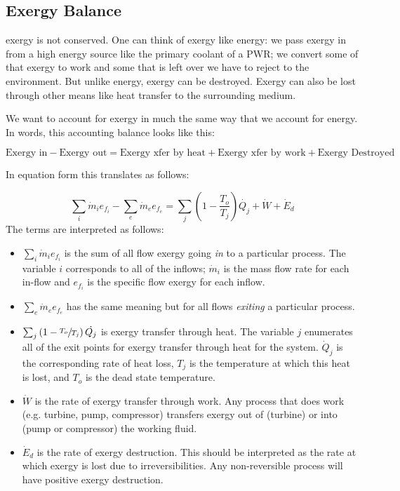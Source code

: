 \subsection{Exergy Balance}
 exergy is not conserved.  One can think of exergy like energy: we pass exergy in from a high energy source like the primary coolant of a PWR; we convert some of that exergy to work and some that is left over we have to reject to the environment.  But unlike energy, exergy can be destroyed. Exergy can also be lost through other means like heat transfer to the surrounding medium.

We want to account for exergy in much the same way that we account for energy.  In words, this accounting balance looks like this:

$$\text{Exergy in} - \text{Exergy out} = \text{Exergy xfer by heat} + \text{Exergy xfer by work} + \text{Exergy Destroyed}$$

In equation form this translates as follows:

$$\sum_i \dot{m}_i e_{f_i} - \sum_e \dot{m}_e e_{f_e} = \sum_j \left(1-\frac{T_o}{T_j} \right)\dot{Q_j}+\dot{W} + \dot{E}_d$$
The terms are interpreted as follows:
\begin{itemize}
\item $\sum_i\dot{m}_i e_{f_i}$ is the sum of all flow exergy going \emph{in} to a particular process.  The variable $i$ corresponds to all of the inflows; $\dot{m}_i$ is the mass flow rate for each in-flow and $e_{f_i}$ is the specific flow exergy for each inflow.
\item $\sum_e \dot{m}_e e_{f_e}$ has the same meaning but for all flows \emph{exiting} a particular process.
\item $\sum_j \left(1-\sfrac{T_o}{T_j} \right)\dot{Q_j}$ is exergy transfer through heat. The variable $j$ enumerates all of the exit points for exergy transfer through heat for the system. $\dot{Q}_j$ is the corresponding rate of heat loss, $T_j$ is the temperature at which this heat is lost, and $T_o$ is the dead state temperature.
\item $\dot{W}$ is the rate of exergy transfer through work.  Any process that does work (e.g. turbine, pump, compressor) transfers exergy out of (turbine) or into (pump or compressor) the working fluid.
\item $\dot{E}_d$ is the rate of exergy destruction.  This should be interpreted as the rate at which exergy is lost due to irreversibilities.  Any non-reversible process will have positive exergy destruction.
\end{itemize}




